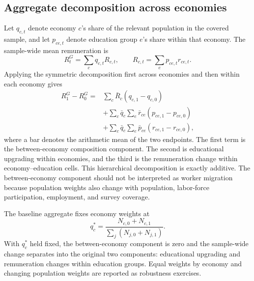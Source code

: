 \subsection{Aggregate decomposition across economies}

Let \(q_{c,t}\) denote economy \(c\)'s share of the relevant population in the
covered sample, and let \(p_{ce,t}\) denote education group \(e\)'s share
within that economy. The sample-wide mean remuneration is
\begin{equation}
  R_t^{G}
  =
  \sum_c q_{c,t} R_{c,t},
  \qquad
  R_{c,t}
  =
  \sum_e p_{ce,t} r_{ce,t}.
  \label{eq:global_wage_identity}
\end{equation}
Applying the symmetric decomposition first across economies and then within
each economy gives
\begin{align}
  R_1^{G}-R_0^{G}
  ={}&
  \sum_c \bar{R}_c\left(q_{c,1}-q_{c,0}\right)
  \nonumber\\
  &+
  \sum_c \bar{q}_c
  \sum_e \bar{r}_{ce}\left(p_{ce,1}-p_{ce,0}\right)
  \nonumber\\
  &+
  \sum_c \bar{q}_c
  \sum_e \bar{p}_{ce}\left(r_{ce,1}-r_{ce,0}\right),
  \label{eq:global_symmetric_decomposition}
\end{align}
where a bar denotes the arithmetic mean of the two endpoints. The first term
is the between-economy composition component. The second is educational
upgrading within economies, and the third is the remuneration change within
economy--education cells. This hierarchical decomposition is exactly
additive. The between-economy component should not be interpreted as worker
migration because population weights also change with population,
labor-force participation, employment, and survey coverage.

The baseline aggregate fixes economy weights at
\begin{equation}
  q_c^{*}
  =
  \frac{N_{c,0}+N_{c,1}}
       {\sum_j\left(N_{j,0}+N_{j,1}\right)}.
  \label{eq:fixed_country_weights}
\end{equation}
With \(q_c^{*}\) held fixed, the between-economy component is zero and the
sample-wide change separates into the original two components: educational
upgrading and remuneration changes within education groups. Equal weights by
economy and changing population weights are reported as robustness exercises.
